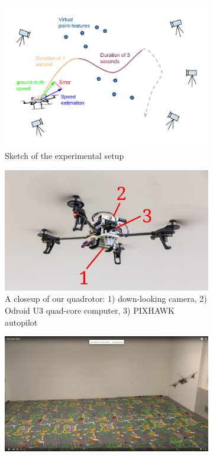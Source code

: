 \documentclass[letterpaper, 10 pt, conference]{ieeeconf}  %
\begin{document}
\begin{figure}
  \centering
  \begin{subfigure}[t]{\columnwidth}
    \includegraphics[width=\textwidth]{images/setupTestDroneError.png}
    \caption{Sketch of the experimental setup}
  \end{subfigure}
  \begin{subfigure}[t]{0.489\columnwidth}
  \includegraphics[width=\textwidth]{images/quadrotor_closeup.jpg}
  \caption{A closeup of our quadrotor: 1) down-looking camera,
2) Odroid U3 quad-core computer, 3) PIXHAWK autopilot}
  \end{subfigure}
  \begin{subfigure}[t]{0.489\columnwidth}
  \includegraphics[width=\textwidth]{images/realExperiment.png}

\end{subfigure}
\end{figure}
\end{document}
